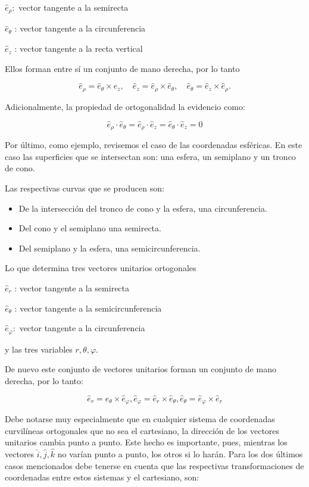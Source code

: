 $\hat{e}_{\rho}:$ vector tangente a la semirecta

$\hat{e}_{\theta}$ : vector tangente a la circunferencia

$\hat{e}_{z}$ : vector tangente a la recta vertical

Ellos forman entre sí un conjunto de mano derecha, por lo tanto

$$
\hat{e}_{\rho}=\hat{e}_{\theta} \times \hat{e}_{z}, \quad \hat{e}_{z}=\hat{e}_{\rho} \times \hat{e}_{\theta}, \quad \widehat{e}_{\theta}=\hat{e}_{z} \times \hat{e}_{\rho} .
$$

Adicionalmente, la propiedad de ortogonalidad la evidencio como:

$$
\widehat{e}_{\rho} \cdot \widehat{e}_{\theta}=\widehat{e}_{\rho} \cdot \widehat{e}_{z}=\widehat{e}_{\theta} \cdot \hat{e}_{z}=0
$$

Por último, como ejemplo, revisemos el caso de las coordenadas esféricas. En este caso las superficies que se intersectan son: una esfera, un semiplano y un tronco de cono.

Las respectivas curvas que se producen son:

\begin{itemize}
  \item De la intersección del tronco de cono y la esfera, una circunferencia.

  \item Del cono y el semiplano una semirecta.

  \item Del semiplano y la esfera, una semicircunferencia.

\end{itemize}

Lo que determina tres vectores unitarios ortogonales

$\hat{e}_{r}$ : vector tangente a la semirecta

$\hat{e}_{\theta}$ : vector tangente a la semicircunferencia

$\hat{e}_{\varphi}:$ vector tangente a la circunferencia

y las tres variables $r, \theta, \varphi$.

De nuevo este conjunto de vectores unitarios forman un conjunto de mano derecha, por lo tanto:

$$
\widehat{e}_{r}=\widehat{e}_{\theta} \times \hat{e}_{\varphi}, \hat{e}_{\varphi}=\widehat{e}_{r} \times \widehat{e}_{\theta}, \widehat{e}_{\theta}=\hat{e}_{\varphi} \times \hat{e}_{r}
$$

Debe notarse muy especialmente que en cualquier sistema de coordenadas curvilíneas ortogonales que no sea el cartesiano, la dirección de los vectores unitarios cambia punto a punto. Este hecho es importante, pues, mientras los vectores $\hat{i}, \hat{j}, \hat{k}$ no varían punto a punto, los otros si lo harán. Para los dos últimos casos mencionados debe tenerse en cuenta que las respectivas transformaciones de coordenadas entre estos sistemas y el cartesiano, son:

